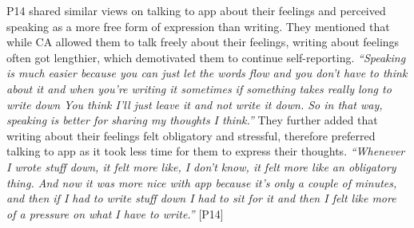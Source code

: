         P14 shared similar views on talking to \ac{app} about their feelings and perceived speaking as a more free form of expression than writing. They mentioned that while \ac{CA} allowed them to talk freely about their feelings, writing about feelings often got lengthier, which demotivated them to continue self-reporting.
                \textit{
                ``Speaking is much easier because you can just let the words flow and you don't have to think about it and when you're writing it sometimes if something takes really long to write down You think I'll just leave it and not write it down. So in that way, speaking is better for sharing my thoughts I think.''
                }
        They further added that writing about their feelings felt obligatory and stressful, therefore preferred talking to \acl{app} as it took less time for them to express their thoughts.
                \textit{
                ``Whenever I wrote stuff down, it felt more like, I don't know, it felt more like an obligatory thing. And now it was more nice with \acl{app} because it's only a couple of minutes, and then if I had to write stuff down I had to sit for it and then I felt like more of a pressure on what I have to write.''
                }
                [P14] 
